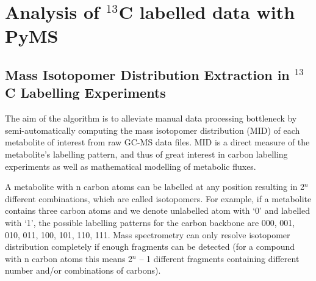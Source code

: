 

\chapter{Analysis of $^{13}$C labelled data with PyMS}


\section
{Mass Isotopomer Distribution Extraction in $^{13}$C Labelling Experiments}


The aim of the algorithm is to alleviate manual data processing bottleneck by 
semi-automatically computing the mass isotopomer distribution (MID) of each 
metabolite of interest from raw GC-MS data files. MID is a direct measure of
the metabolite's labelling pattern, and thus of great interest in carbon
labelling experiments as well as mathematical modelling of metabolic fluxes.

A metabolite with n carbon atoms can be labelled at any position resulting in
2$^{n}$ different combinations, which are called isotopomers. For example, 
if a metabolite contains three carbon atoms and we denote unlabelled atom with
 ‘0’ and labelled with ‘1’, the possible labelling patterns for the carbon 
backbone are 000, 001, 010, 011, 100, 101, 110, 111. Mass spectrometry can only
resolve isotopomer distribution completely if enough fragments can be detected 
(for a compound with n carbon atoms this means 2$^{n}$ – 1 different fragments 
containing different number and/or combinations of carbons).


